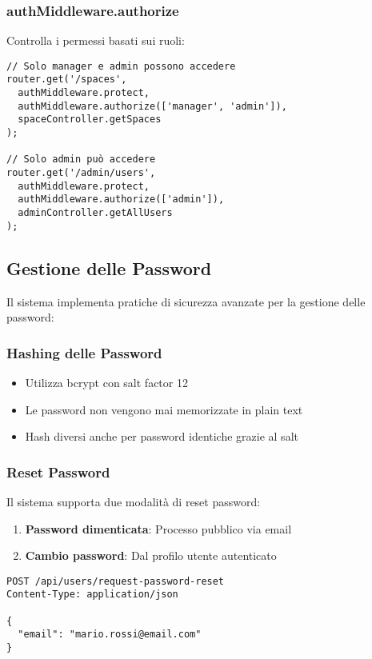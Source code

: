 \subsubsection{authMiddleware.authorize}
Controlla i permessi basati sui ruoli:

\begin{lstlisting}[style=httpstyle, caption=Esempi Utilizzo Authorization]
// Solo manager e admin possono accedere
router.get('/spaces', 
  authMiddleware.protect, 
  authMiddleware.authorize(['manager', 'admin']), 
  spaceController.getSpaces
);

// Solo admin può accedere
router.get('/admin/users', 
  authMiddleware.protect, 
  authMiddleware.authorize(['admin']), 
  adminController.getAllUsers
);
\end{lstlisting}

\subsection{Gestione delle Password}
Il sistema implementa pratiche di sicurezza avanzate per la gestione delle password:

\subsubsection{Hashing delle Password}
\begin{itemize}
    \item Utilizza bcrypt con salt factor 12
    \item Le password non vengono mai memorizzate in plain text
    \item Hash diversi anche per password identiche grazie al salt
\end{itemize}

\subsubsection{Reset Password}
Il sistema supporta due modalità di reset password:

\begin{enumerate}
    \item \textbf{Password dimenticata}: Processo pubblico via email
    \item \textbf{Cambio password}: Dal profilo utente autenticato
\end{enumerate}

\begin{lstlisting}[style=httpstyle, caption=Richiesta Reset Password]
POST /api/users/request-password-reset
Content-Type: application/json

{
  "email": "mario.rossi@email.com"
}
\end{lstlisting}

